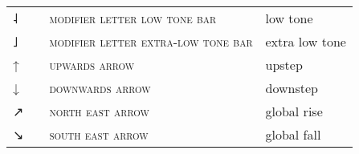 \begin{center}
\begin{xtabular}{ l L{1.2cm} L{6.6cm} L{3cm} }
{˨} &  & \textsc{modifier letter low tone bar} & low tone \\
{˩} &  & \textsc{modifier letter extra-low tone bar} & extra low tone \\
{↑} &  & \textsc{upwards arrow} & upstep \\
{↓} &  & \textsc{downwards arrow} & downstep \\
{↗} &  & \textsc{north east arrow} & global rise \\
{↘} &  & \textsc{south east arrow} & global fall \\
\end{xtabular}
\end{center}